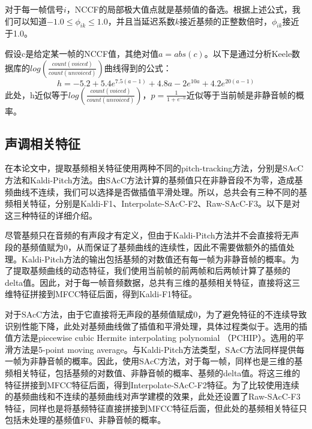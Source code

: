 对于每一帧信号$i$，NCCF的局部极大值点就是基频值的备选。根据上述公式，我们可以知道$-1.0\leqslant\phi_{ik}\leqslant1.0$，并且当延迟系数$k$接近基频的正整数倍时，$\phi_{ik}$接近于1.0。

假设c是给定某一帧的NCCF值，其绝对值$a=abs(c)$。以下是通过分析Keele数据库的$log(\frac{count(voiced)}{count(unvoiced)})$曲线得到的公式：
\begin{equation}h=-5.2+5.4 e^{7.5 (a-1)}+4.8 a-2 e^{10 a}+4.2 e^{20 (a-1)}\end{equation}
此处，h近似等于$log(\frac{count(voiced)}{count(unvoiced)})$，$p=\frac{1}{1+e^{-h}}$近似等于当前帧是非静音帧的概率。
\subsection{声调相关特征}
在本论文中，提取基频相关特征使用两种不同的pitch-tracking方法，分别是SAcC方法和Kaldi-Pitch方法。由SAcC方法计算的基频值只在非静音段不为零，造成基频曲线不连续，我们可以选择是否做插值平滑处理。所以，总共会有三种不同的基频相关特征，分别是Kaldi-F1、Interpolate-SAcC-F2、Raw-SAcC-F3。以下是对这三种特征的详细介绍。

尽管基频只在音频的有声段才有定义，但由于Kaldi-Pitch方法并不会直接将无声段的基频值赋为0，从而保证了基频曲线的连续性，因此不需要做额外的插值处理。Kaldi-Pitch方法的输出包括基频的对数值还有每一帧为非静音帧的概率。为了提取基频曲线的动态特征，我们使用当前帧的前两帧和后两帧计算了基频的delta值。因此，对于每一帧音频数据，总共有三维的基频相关特征，直接将这三维特征拼接到MFCC特征后面，得到Kaldi-F1特征。

对于SAcC方法，由于它直接将无声段的基频值赋成0，为了避免特征的不连续导致识别性能下降，此处对基频曲线做了插值和平滑处理，具体过程类似于\cite{lei2006improved}。选用的插值方法是piecewise cubic Hermite interpolating polynomial （PCHIP）\cite{fritsch1980monotone}。选用的平滑方法是5-point moving average。与Kaldi-Pitch方法类型，SAcC方法同样提供每一帧为非静音帧的概率。因此，使用SAcC方法，对于每一帧，同样也是三维的基频相关特征，包括基频的对数值、非静音帧的概率、基频的delta值。将这三维的特征拼接到MFCC特征后面，得到Interpolate-SAcC-F2特征。为了比较使用连续的基频曲线和不连续的基频曲线对声学建模的效果，此处还设置了Raw-SAcC-F3特征，同样也是将基频特征直接拼接到MFCC特征后面，但此处的基频相关特征只包括未处理的基频值F0、非静音帧的概率。

